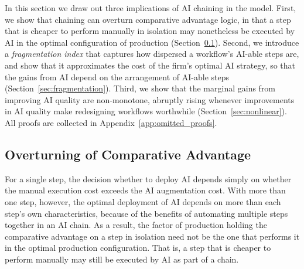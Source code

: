 In this section we draw out three implications of AI chaining in the model.
First, we show that chaining can overturn comparative advantage logic, in that a step that is cheaper to perform manually in isolation may nonetheless be executed by AI in the optimal configuration of production (Section~\ref{sec:comparative_advantage}).
Second, we introduce a \emph{fragmentation index} that captures how dispersed a workflow's AI-able steps are, and show that it approximates the cost of the firm's optimal AI strategy, so that the gains from AI depend on the arrangement of AI-able steps (Section~\ref{sec:fragmentation}).
Third, we show that the marginal gains from improving AI quality are non-monotone, abruptly rising whenever improvements in AI quality make redesigning workflows worthwhile (Section~\ref{sec:nonlinear}).
All proofs are collected in Appendix~\ref{app:omitted_proofs}.

\subsection{Overturning of Comparative Advantage}
\label{sec:comparative_advantage}

For a single step, the decision whether to deploy AI depends simply on whether the manual execution cost exceeds the AI augmentation cost.
With more than one step, however, the optimal deployment of AI depends on more than each step's own characteristics, because of the benefits of automating multiple steps together in an AI chain.
As a result, the factor of production holding the comparative advantage on a step in isolation need not be the one that performs it in the optimal production configuration.
That is, a step that is cheaper to perform manually may still be executed by AI as part of a chain.

